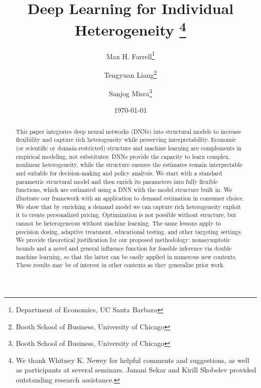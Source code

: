 \documentclass[12pt]{article}
\numberwithin{equation}{section}
\theoremstyle{definition}
\begin{document}
\title{
	Deep Learning for Individual Heterogeneity 
	\thanks{
         We thank Whitney K. Newey for helpful comments and suggestions, as well as participants at several seminars. Janani Sekar and Kirill Skobelev provided outstanding research assistance.
    }
}

\author{
	Max H. Farrell\thanks{Department of Economics, UC Santa Barbara} \and Tengyuan Liang\thanks{Booth School of Business, University of Chicago} \and
	Sanjog Misra\thanks{Booth School of Business, University of Chicago} \and
}



\date{\today}

\maketitle



\begin{abstract} 
 This paper integrates deep neural networks (DNNs) into structural models to increase flexibility and capture rich heterogeneity while preserving interpretability. Economic (or scientific or domain-restricted) structure and machine learning are complements in empirical modeling, not substitutes: DNNs provide the capacity to learn complex, nonlinear heterogeneity, while the structure ensures the estimates remain interpretable and suitable for decision-making and policy analysis. We start with a standard parametric structural model and then enrich its parameters into fully flexible functions, which are estimated using a DNN with the model structure built in. We illustrate our framework with an application to demand estimation in consumer choice. We show that by enriching a demand model we can capture rich heterogeneity exploit it to create personalized pricing. Optimization is not possible without structure, but cannot be heterogeneous without machine learning. The same lessons apply to precision dosing, adaptive treatment, educational testing, and other targeting settings. We provide theoretical justification for our proposed methodology: nonasymptotic bounds and a novel and general influence function for feasible inference via double machine learning, so that the latter can be easily applied in numerous new contexts. These results may be of interest in other contexts as they generalize prior work.
\end{abstract}
\end{document}

